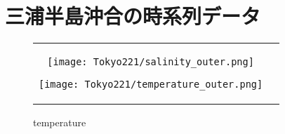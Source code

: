 \documentclass[12pt,a4paper]{jsarticle}
\begin{document}
\section{三浦半島沖合の時系列データ}
\begin{figure}[hbtp]
  \begin{tabular}{cc}
    \begin{minipage}[t]{0.5\hsize}
      \centering
      \texttt{[image: Tokyo221/salinity\_outer.png]}
      \caption{salinity}
    \end{minipage} 
    \begin{minipage}[t]{0.5\hsize}
      \centering
      \texttt{[image: Tokyo221/temperature\_outer.png]}
      \caption{temperature}
    \end{minipage} 
  \end{tabular}
\end{figure}
\end{document}

